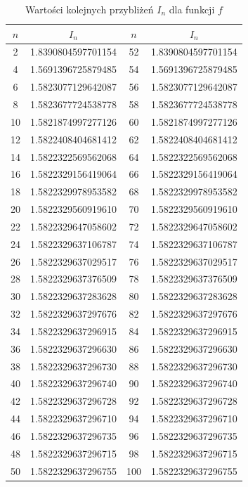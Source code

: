 \documentclass{article}
\begin{document}
    \begin{table}[htb]
      \centering
      \caption{Wartości kolejnych przybliżeń $I_n$ dla funkcji $f$}
      \label{tab:f}
      \begin{tabular}{|c|c|c|c|}
        \hline
        $n$ & $I_n$              & $n$ & $I_n$              \\ \hline
         2  & 1.8390804597701154 &  52 & 1.8390804597701154 \\
         4  & 1.5691396725879485 &  54 & 1.5691396725879485 \\
         6  & 1.5823077129642087 &  56 & 1.5823077129642087 \\
         8  & 1.5823677724538778 &  58 & 1.5823677724538778 \\
        10  & 1.5821874997277126 &  60 & 1.5821874997277126 \\
        12  & 1.5822408404681412 &  62 & 1.5822408404681412 \\
        14  & 1.5822322569562068 &  64 & 1.5822322569562068 \\
        16  & 1.5822329156419064 &  66 & 1.5822329156419064 \\
        18  & 1.5822329978953582 &  68 & 1.5822329978953582 \\
        20  & 1.5822329560919610 &  70 & 1.5822329560919610 \\
        22  & 1.5822329647058602 &  72 & 1.5822329647058602 \\
        24  & 1.5822329637106787 &  74 & 1.5822329637106787 \\
        26  & 1.5822329637029517 &  76 & 1.5822329637029517 \\
        28  & 1.5822329637376509 &  78 & 1.5822329637376509 \\
        30  & 1.5822329637283628 &  80 & 1.5822329637283628 \\
        32  & 1.5822329637297676 &  82 & 1.5822329637297676 \\
        34  & 1.5822329637296915 &  84 & 1.5822329637296915 \\
        36  & 1.5822329637296630 &  86 & 1.5822329637296630 \\
        38  & 1.5822329637296730 &  88 & 1.5822329637296730 \\
        40  & 1.5822329637296740 &  90 & 1.5822329637296740 \\
        42  & 1.5822329637296728 &  92 & 1.5822329637296728 \\
        44  & 1.5822329637296710 &  94 & 1.5822329637296710 \\
        46  & 1.5822329637296735 &  96 & 1.5822329637296735 \\
        48  & 1.5822329637296715 &  98 & 1.5822329637296715 \\
        50  & 1.5822329637296755 & 100 & 1.5822329637296755 \\ \hline
      \end{tabular}
    \end{table}
\end{document}
